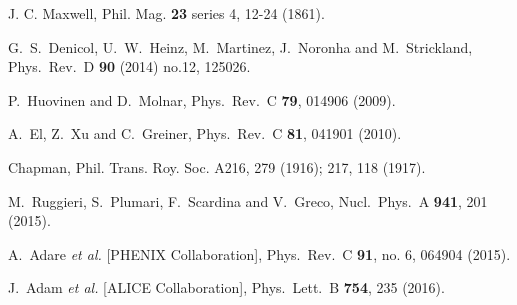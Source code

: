 \documentclass[aps,prc,a4paper,nofootinbib,
preprintnumbers,superscriptaddress,twocolumn,showpacs,showkeys]{revtex4}
\begin{document}
\begin{thebibliography}{99}
  
J. C. Maxwell, Phil. Mag. {\bf 23} series 4, 12-24 (1861).  
  
  G.~S.~Denicol, U.~W.~Heinz, M.~Martinez, J.~Noronha and M.~Strickland,
  Phys.\ Rev.\ D {\bf 90} (2014) no.12,  125026.

  P.~Huovinen and D.~Molnar,
  Phys.\ Rev.\ C {\bf 79}, 014906 (2009).
  
  A.~El, Z.~Xu and C.~Greiner,
  Phys.\ Rev.\ C {\bf 81}, 041901 (2010).
  
Chapman, Phil. Trans. Roy. Soc. A216, 279 (1916); 217, 118 (1917).  


  M.~Ruggieri, S.~Plumari, F.~Scardina and V.~Greco,
  Nucl.\ Phys.\ A {\bf 941}, 201 (2015).
  
  A.~Adare {\it et al.} [PHENIX Collaboration],
  Phys.\ Rev.\ C {\bf 91}, no. 6, 064904 (2015).
  
  J.~Adam {\it et al.} [ALICE Collaboration],
  Phys.\ Lett.\ B {\bf 754}, 235 (2016).
  
  
\end{thebibliography}
\end{document}
